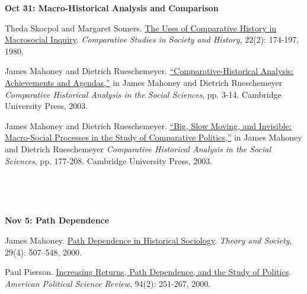 \documentclass[letterpaper]{article}
\renewenvironment{itemize}{
  \begin{list}{}{
    \setlength{\leftmargin}{1.5em}
  }
}{
  \end{list}
}
\begin{document}
\begin{enumerate}
		\begin{itemize}
		\item {\bf Oct 31: Macro-Historical Analysis and Comparison}
			\begin{itemize}
				\item[$\bullet$] Theda Skocpol and Margaret Somers. \href{http://www.jstor.org/stable/178404}{The Uses of Comparative History in Macrosocial Inquiry}. \emph{Comparative Studies in Society and History}, 22(2): 174-197, 1980.
				\item[$\bullet$] James Mahoney and Dietrich Rueschemeyer. \href{https://content.schweitzer-online.de/static/catalog_manager/live/media_files/representation/zd_std_orig__zd_schw_orig/002/352/762/9780521816106_content_pdf_1.pdf}{``Comparative-Historical Analysis: Achievements and Agendas,''} in James Mahoney and Dietrich Rueschemeyer \emph{Comparative Historical Analysis in the Social Sciences}, pp. 3-14. Cambridge University Press, 2003. 
				\item[$\bullet$] James Mahoney and Dietrich Rueschemeyer. \href{https://www.google.com/url?sa=t&rct=j&q=&esrc=s&source=web&cd=2&cad=rja&uact=8&ved=0ahUKEwjjlebb7sTbAhXyna0KHWH9AGAQFggrMAE&url=https%3A%2F%2Fcanvas.coloradocollege.edu%2Ffiles%2F5333%2Fdownload%3Fdownload_frd%3D1%26verifier%3DGzimNk8tWeD5HoK4czIDYdyyDjqXAaGUzFWhFDLD&usg=AOvVaw0XARLEGWJXOsc2uYGyFbPO}{``Big, Slow Moving, and Invisible: Macro-Social Processes in the Study of Comparative Politics,''} in James Mahoney and Dietrich Rueschemeyer \emph{Comparative Historical Analysis in the Social Sciences}, pp. 177-208. Cambridge University Press, 2003.

			\end{itemize}
		\end{itemize}

~\\
\item[] \begin{center}{\color{blue}{\bf Friday 2: No recitation.}}\end{center}
~\\

		\begin{itemize}
		\item {\bf Nov 5: Path Dependence}
			\begin{itemize}
				\item[$\bullet$] James Mahoney. \href{https://doi.org/10.1023/A:100711383}{Path Dependence in Historical Sociology}. \emph{Theory and Society}, 29(4): 507–548, 2000. 
				\item[$\bullet$] Paul Pierson. \href{http://www.jstor.org/stable/2586011}{Increasing Returns, Path Dependence, and the Study of Politics}. \emph{American Political Science Review}, 94(2): 251-267, 2000. 
			\end{itemize}
		\end{itemize}







\end{enumerate}
\end{document}
